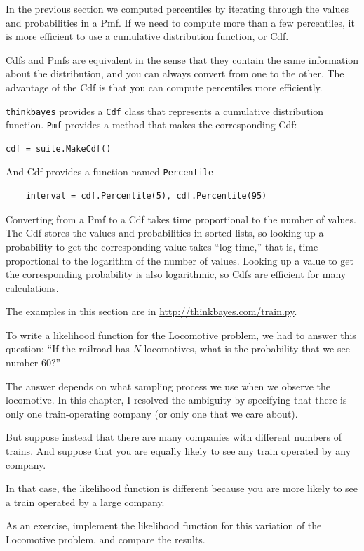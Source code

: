 \documentclass[12pt]{book}
\begin{document}
In the previous section we computed percentiles by iterating through
the values and probabilities in a Pmf.  If we need to compute more
than a few percentiles, it is more efficient to use a cumulative
distribution function, or Cdf.

Cdfs and Pmfs are equivalent in the sense that they contain the
same information about the distribution, and you can always convert
from one to the other.  The advantage of the Cdf is that you can
compute percentiles more efficiently.

{\tt thinkbayes} provides a {\tt Cdf} class that represents a
cumulative distribution function.  {\tt Pmf} provides a method
that makes the corresponding Cdf:

\begin{verbatim}
cdf = suite.MakeCdf()
\end{verbatim}

And Cdf provides a function named \verb"Percentile"

\begin{verbatim}
    interval = cdf.Percentile(5), cdf.Percentile(95)
\end{verbatim}

Converting from a Pmf to a Cdf takes time proportional to the number
of values.  The Cdf stores the values and probabilities in sorted
lists, so looking up a probability to get the corresponding value
takes ``log time,'' that is, time proportional to the logarithm of the
number of values.  Looking up a value to get the corresponding
probability is also logarithmic, so Cdfs are efficient for many
calculations.

The examples in this section are in \url{http://thinkbayes.com/train.py}.


\begin{exercise}
To write a likelihood function for the Locomotive problem, we had
to answer this question:  ``If the railroad has $N$ locomotives, what
is the probability that we see number 60?''

The answer depends on what sampling process we use when we observe the
locomotive.  In this chapter, I resolved the ambiguity by specifying
that there is only one train-operating company (or only one that we
care about).

But suppose instead that there are many companies with different
numbers of trains.  And suppose that you are equally likely to see any
train operated by any company.

In that case, the likelihood function is different because you
are more likely to see a train operated by a large company.

As an exercise, implement the likelihood function for this variation
of the Locomotive problem, and compare the results.

\end{exercise}
\end{document}
